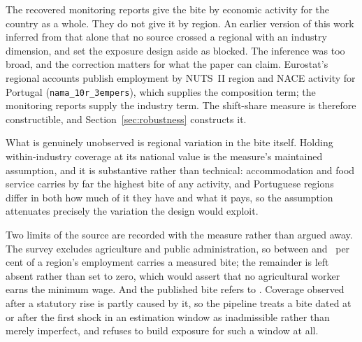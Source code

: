 The recovered monitoring reports give the bite by economic activity for the
country as a whole. They do not give it by region. An earlier version of this
work inferred from that alone that no source crossed a regional with an industry
dimension, and set the exposure design aside as blocked. The inference was too
broad, and the correction matters for what the paper can claim. Eurostat's
regional accounts publish employment by NUTS~II region and NACE activity for
Portugal (\texttt{nama\_10r\_3empers}), which supplies the composition term;
the monitoring reports supply the industry term. The shift-share measure is
therefore constructible, and Section~\ref{sec:robustness} constructs it.

What is genuinely unobserved is regional variation in the bite itself. Holding
within-industry coverage at its national value is the measure's maintained
assumption, and it is substantive rather than technical: accommodation and food
service carries by far the highest bite of any activity, and Portuguese regions
differ in both how much of it they have and what it pays, so the assumption
attenuates precisely the variation the design would exploit.

Two limits of the source are recorded with the measure rather than argued away.
The survey excludes agriculture and public administration, so between
\ExposureCoverageMinPct{} and \ExposureCoverageMaxPct{}~per cent of a region's
employment carries a measured bite; the remainder is left absent rather than set
to zero, which would assert that no agricultural worker earns the minimum wage.
And the published bite refers to \ExposureBitePeriod{}. Coverage observed after
a statutory rise is partly caused by it, so the pipeline treats a bite dated at
or after the first shock in an estimation window as inadmissible rather than
merely imperfect, and refuses to build exposure for such a window at all.
